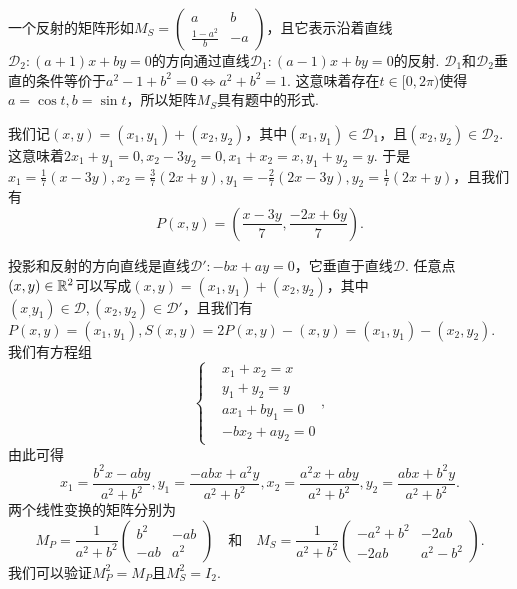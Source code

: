 \begin{solution}
  一个反射的矩阵形如$M_S=\begin{pmatrix}
    a & b \\
    \frac{1-a^2}b & -a
  \end{pmatrix}$，且它表示沿着直线$\mathscr D_2:(a+1)x+by=0$的方向通过直线$\mathscr D_1:(a-1)x+by=0$的反射. $\mathscr D_1$和$\mathscr D_2$垂直的条件等价于$a^2-1+b^2=0\Leftrightarrow a^2+b^2=1$. 这意味着存在$t\in[0,2\pi)$使得$a=\cos t,b=\sin t$，所以矩阵$M_S$具有题中的形式.
\end{solution}

\begin{solution}
  我们记$(x,y)=(x_1,y_1)+(x_2,y_2)$，其中$(x_1,y_1)\in\mathscr D_1$，且$(x_2,y_2)\in\mathscr D_2$. 这意味着$2x_1+y_1=0,x_2-3y_2=0,x_1+x_2=x,y_1+y_2=y$. 于是$x_1=\frac17(x-3y),x_2=\frac37(2x+y),
  y_1=-\frac27(2x-3y),y_2=\frac17(2x+y)$，且我们有
  \[
    P(x,y) = \left( \frac{x-3y}7, \frac{-2x+6y}7 \right).
  \]
\end{solution}

\begin{solution}
  投影和反射的方向直线是直线$\mathscr D':-bx+ay=0$，它垂直于直线$\mathscr D$. 任意点$(x,y)\in\mathbb R^2$可以写成$(x,y)=(x_1,y_1)+(x_2,y_2)$，其中$(x_,y_1)\in\mathscr D,(x_2,y_2)\in\mathscr D'$，且我们有$P(x,y)=(x_1,y_1),S(x,y)=2P(x,y)-(x,y)=(x_1,y_1)-(x_2,y_2)$. 我们有方程组
  \[
    \left\{
      \begin{aligned}
        & x_1 + x_2 = x \\
        & y_1 + y_2 = y \\
        & ax_1 + by_1 = 0 \\
        & -bx_2 + ay_2 = 0
      \end{aligned}
    \right.,
  \]
  由此可得
  \[
    x_1 = \frac{b^2x-aby}{a^2+b^2}, y_1 = \frac{-abx+a^2y}{a^2+b^2}, x_2 = \frac{a^2x+aby}{a^2+b^2}, y_2 = \frac{abx+b^2y}{a^2+b^2}.
  \]
  两个线性变换的矩阵分别为
  \[
    M_P = \frac1{a^2+b^2} \begin{pmatrix}
      b^2 & -ab \\
      -ab & a^2
    \end{pmatrix} \quad \text{和} \quad
    M_S = \frac1{a^2+b^2}
    \begin{pmatrix}
      -a^2 + b^2 & -2ab \\
      -2ab & a^2 - b^2
    \end{pmatrix}.
  \]
  我们可以验证$M_P^2=M_P$且$M_S^2=I_2$.
\end{solution}

